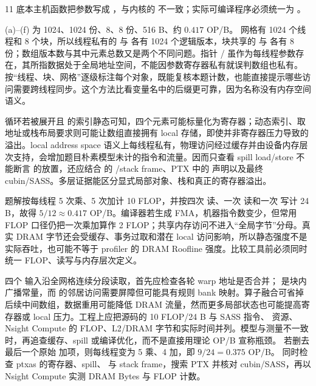 \begin{solutionexercise}{11}
\editorialnote 底本主机函数把参数写成 ，与内核的 
不一致；实际可编译程序必须统一为 。

\conclusionheading (a)--(f) 为 1024、1024 份、8、8 份、516 B、约
$0.417$ OP/B。
\discussionheading
{}
网格有 1024 个线程和 8 个块，所以线程私有的  与  各有 1024 个逻辑版本，块共享的  与  各有 8 份；数组版本数与其中元素总数又是两个不同问题。指针 / 虽作为每线程参数存在，其所指数据处于全局地址空间，不能因参数寄存器私有就误判数组也私有。按“线程、块、网格”逐级标注每个对象，既能复核本题计数，也能直接提示哪些访问需要跨线程同步。这个方法比看变量名中的后缀更可靠，因为名称没有内存空间语义。

循环若被展开且  的索引静态可知，四个元素可能标量化为寄存器；动态索引、取地址或栈布局要求则可能让数组直接拥有 local 存储，即使并非寄存器压力导致的溢出。local address space 语义上每线程私有，物理访问经过缓存并由设备内存层次支持，会增加题目朴素模型未计的指令和流量。因而只查看 spill load/store 不能断言  的放置，还应结合  的 /stack frame、PTX 中的  声明以及最终 cubin/SASS。多层证据能区分显式局部对象、栈和真正的寄存器溢出。

题解按每线程 5 次乘、5 次加计 10 FLOP，并按四次  读、一次  读和一次  写计 24 B，故得 $5/12\approx0.417$ OP/B。编译器若生成 FMA，机器指令数变少，但常用 FLOP 口径仍把一次乘加算作 2 FLOP；共享内存访问不进入“全局字节”分母。真实 DRAM 字节还会受缓存、事务过取和潜在 local 访问影响，所以静态强度不是实际吞吐，也可能不等于 profiler 的 DRAM Roofline 强度。比较工具前必须同时统一 FLOP、读写与内存层次定义。

四个  输入沿全网格连续分段读取，首先应检查各轮 warp 地址是否合并； 是块内广播常量，而  的邻居访问需要屏障但可能具有规则 bank 映射。算子融合可省掉后续中间数组，数据重用可能降低 DRAM 流量，然而更多局部状态也可能提高寄存器或 local 压力。工程上应把源码的 10 FLOP/24 B 与 SASS 指令、 资源、Nsight Compute 的 FLOP、L2/DRAM 字节和实际时间并列。模型与测量不一致时，再追查缓存、spill 或编译优化，而不是直接用理论 OP/B 宣称瓶颈。
\variantheading 若删去最后一个原始  加项，则每线程变为 5 乘、4 加，即 $9/24=0.375$ OP/B。
\practiceheading 同时检查 ptxas 的寄存器、spill、 与 stack frame，搜索 PTX  并核对 cubin/SASS，再以 Nsight Compute 实测 DRAM Bytes 与 FLOP 计数。
\end{solutionexercise}

